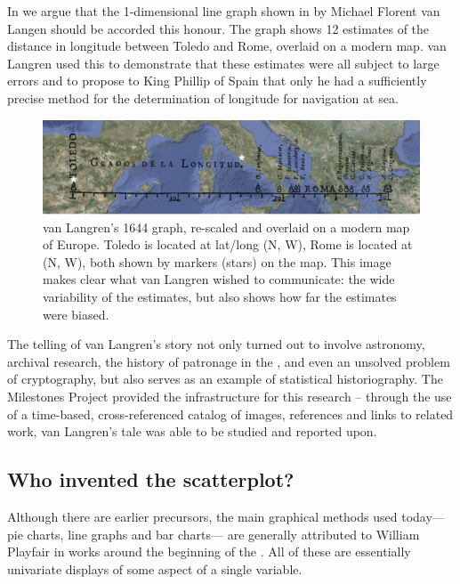 In \citet{Friendly-etal:2010:langren} we argue that the 1-dimensional line graph shown in  by Michael Florent van Langen \citep{Langren:1644} should be accorded this honour. The graph shows 12 estimates of the distance in longitude between Toledo and Rome, overlaid on a modern map. van Langren used this to demonstrate that these estimates were all subject to large errors and to
propose to King Phillip of Spain that only he had a sufficiently precise method for the determination of longitude for navigation at sea.

\begin{figure}[htb]
 \centering
 \includegraphics[width=\textwidth]{fig/langren-google-overlay2}
 \caption{van Langren's 1644 graph, re-scaled and overlaid on a modern map of Europe. Toledo is located at lat/long %
(N, W), Rome is located at (N, W), both shown by markers (stars) on the map.  This image makes clear what van Langren wished to communicate: the wide variability of the estimates, but also shows how far the estimates were biased.}%
\label{fig:langren-google-overlay}
\end{figure}

The telling of van Langren's story not only turned out to involve astronomy, archival research, the history of patronage in the , and even an unsolved problem of cryptography, but also serves as an example of statistical historiography.  The Milestones Project provided the infrastructure for this research -- through the use of a time-based, cross-referenced catalog of images, references and links to related work, van Langren's tale was able to be studied and reported upon.

\subsection{Who invented the scatterplot?}
Although there are earlier precursors, the main graphical methods used today---
pie charts, line graphs and bar charts--- are generally attributed to
William Playfair in works around the beginning of the 
\citep{Playfair:1786,Playfair:1801}. All of these are essentially univariate
displays of some aspect of a single variable. 

